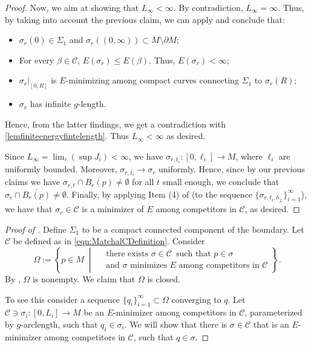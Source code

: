 \documentclass[12pt,a4paper,reqno]{amsart}
\theoremstyle{definition}
\renewcommand{\leq}{\leqslant}
\begin{document}
{\begin{proof}
{{{Now, we aim at showing that $L_\infty<\infty$. By contradiction, $L_\infty=\infty$. Thus, by taking into account the previous claim, we can apply  and conclude that:
\begin{itemize}
    \item $\sigma_r(0)\in \Sigma_1$ and $\sigma_r((0,\infty))\subset M\setminus\partial M$;
    \item For every $\beta\in\mathcal{C}$, $E(\sigma_r)\leq E(\beta)$. Thus, $E(\sigma_r)<\infty$;
    \item $\sigma_{r}|_{[0,R]}$ is $E$-minimizing among compact curves connecting $\Sigma_1$ to $\sigma_r(R)$;
    \item $\sigma_r$ has infinite $g$-length.
\end{itemize}
Hence, from the latter findings, we get a contradiction with \cref{lemfiniteenergyfintelength}. Thus $L_\infty<\infty$ as desired.}}

Since $L_\infty=\lim_i(\sup J_i)<\infty$, we have $\sigma_{r,t_i}:[0,\ell_i]\to M$, where $\ell_i$ are uniformly bounded. Moreover, $\sigma_{r,t_i}\to \sigma_{r}$ uniformly.
Hence, since by our previous claims we have $\sigma_{r,t}\cap\overline{B_r(p)}\neq\emptyset$ for all $t$ small enough, we conclude that $\sigma_r\cap \overline{B_r(p)}\neq \emptyset$. Finally, by applying Item (4) of  (to the sequence $\{\sigma_{r,t_i,h_{j_i}}\}_{i=1}^\infty$), we have that $\sigma_r\in\mathcal{C}$ is a minimizer of $E$ among competitors in $\mathcal{C}$, as desired.
}
\end{proof}

\begin{proof}[Proof of ]
Define $\Sigma_1$ to be a compact connected component of the boundary. Let $\mathcal{C}$ be defined as in \eqref{eqn:MatchalCDefinition}.
    Consider
\[
\Omega := \left\{ p \in M \;\middle|\;
\begin{aligned}
&\text{there exists $\sigma\in\mathcal{C}$}\,\text{ such that $p\in\sigma$} \\
&\hspace{0pt}\text{and $\sigma$ minimizes $E$ among competitors in $\mathcal{C}$}
\end{aligned}
\right\}.
\]
By , $\Omega$ is nonempty.
We claim that $\Omega$ is closed. 

To see this consider a sequence $\{q_i\}_{i=1}^\infty\subset \Omega$ converging to $q$. Let $\mathcal{C}\ni\sigma_{i}:[0,L_i]\to M$ be an $E$-minimizer among competitors in $\mathcal{C}$, parameterized by $g$-arclength, such that $q_i\in\sigma_i$. We will show that there is $\sigma\in\mathcal{C}$ that is an $E$-minimizer among competitors in $\mathcal{C}$, such that $q\in\sigma$.


\end{proof}}
\end{document}
